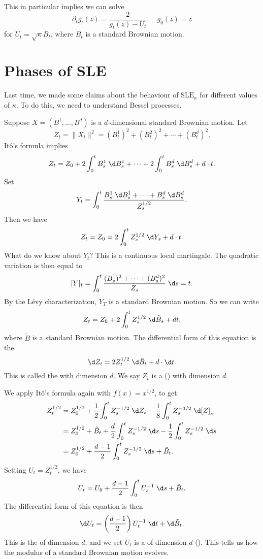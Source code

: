 \documentclass[a4paper]{article}
\newcommand\SLE{\mathrm{SLE}}
\begin{document}
This in particular implies we can solve
\[
  \partial_t g_t(z) = \frac{2}{g_t(z) - U_t},\quad g_0(z) = z
\]
for $U_t = \sqrt{\kappa} B_t$, where $B_t$ is a standard Brownian motion.

\section{Phases of SLE}
Last time, we made some claims about the behaviour of $\SLE_\kappa$ for different values of $\kappa$. To do this, we need to understand Bessel processes.

Suppose $X = (B^1, \ldots, B^d)$ is a $d$-dimensional standard Brownian motion. Let
\[
  Z_t = \|X_t\|^2 = (B_t^1)^2 + (B_t^2)^2 + \cdots + (B_t^d)^2.
\]
It\^o's formula implies
\[
  Z_t = Z_0 + 2 \int_0^t B_s^1 \;\d B_s^1 + \cdots + 2 \int_0^t B_s^d\;\d B_s^d + d\cdot t.
\]
Set
\[
  Y_t = \int_0^t \frac{B_s^1 \;\d B_s^1 + \cdots + B_s^d \;\d B_s^d}{Z_s^{1/2}}.
\]
Then we have
\[
  Z_t = Z_0 = 2 \int_0^t Z_s^{1/2} \;\d Y_s + d\cdot t.
\]
What do we know about $Y_t$? This is a continuous local martingale. The quadratic variation is then equal to
\[
  [Y]_t = \int_0^t \frac{(B_s^1)^2 + \cdots + (B_s^d)^2}{Z_s}\;\d s = t.
\]
By the L\'evy characterization, $Y_T$ is a standard Brownian motion. So we can write
\[
  Z_t = Z_0 + 2 \int_0^t Z_s^{1/2}\;\d \tilde{B}_s + dt,
\]
where $\tilde{B}$ is a standard Brownian motion. The differential form of this equation is the
\[
  \d Z_t = 2 Z_t^{1/2} \;\d \tilde{B}_t + d \cdot \d t.
\]
This is called the  with dimension $d$. We say $Z_t$ is a  () with dimension $d$.

We apply It\^o's formula again with $f(x) = x^{1/2}$, to get
\begin{align*}
  Z_t^{1/2} &= Z_0^{1/2} + \frac{1}{2} \int_0^t Z_s^{-1/2} \;\d Z_s - \frac{1}{8} \int_0^t Z_s^{-3/2} \;\d [Z]_s\\
  &= Z_0^{1/2} + \tilde{B}_t + \frac{d}{2} \int_0^t Z_s^{-1/2}\;\d s - \frac{1}{2} \int_0^t Z_s^{-1/2} \;\d s\\
  &= Z_0^{1/2} + \frac{d - 1}{2} \int_0^t Z_s^{-1/2}\;\d s + \tilde{B}_t.
\end{align*}
Setting $U_t = Z_t^{1/2}$, we have
\[
  U_t = U_0 + \frac{d - 1}{2} \int_0^t U_s^{-1}\;\d s + \tilde{B}_t.
\]
The differential form of this equation is then
\[
  \d U_t = \left(\frac{d - 1}{2}\right) U_t^{-1}\;\d t + \d \tilde{B}_t.
\]
This is the  of dimension $d$, and we set $U_t$ is a  of dimension $d$ (). This tells us how the modulus of a standard Brownian motion evolves.
\end{document}

